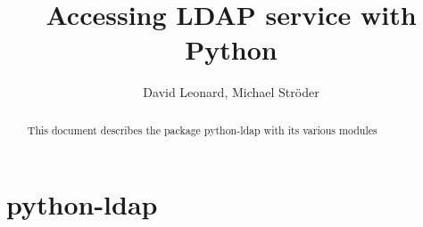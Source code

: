 \documentclass{manual}
\title{Accessing LDAP service with Python}
\author{David Leonard, Michael Str\"oder}
\begin{document}
\maketitle

\begin{abstract}
\noindent
This document describes the package python-ldap with its various modules
\end{abstract}

\tableofcontents

\chapter{ python-ldap }







\renewcommand{\indexname}{Index}
\end{document}
